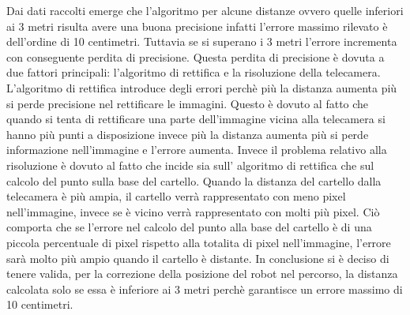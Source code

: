 	Dai dati raccolti emerge che l'algoritmo per alcune distanze ovvero quelle inferiori ai 3 metri risulta avere una buona precisione infatti l'errore massimo rilevato è dell'ordine di 10 centimetri. Tuttavia se si superano i 3 metri l'errore incrementa con conseguente perdita di precisione. Questa perdita di precisione è dovuta a due fattori principali: l'algoritmo di rettifica e la risoluzione della telecamera. L'algoritmo di rettifica introduce degli errori perchè più la distanza aumenta più si perde precisione nel rettificare le immagini. Questo è dovuto al fatto che quando si tenta di rettificare una parte dell'immagine vicina alla telecamera si hanno più punti a disposizione invece più la distanza aumenta più si perde informazione nell'immagine e l'errore aumenta. Invece il problema relativo alla risoluzione è dovuto al fatto che incide sia sull' algoritmo di rettifica che sul calcolo del punto sulla base del cartello. Quando la distanza del cartello dalla telecamera è più ampia, il cartello verrà rappresentato con meno pixel nell'immagine, invece se è vicino verrà rappresentato con molti più pixel. Ciò comporta che se l'errore nel calcolo del punto alla base del cartello è di una piccola percentuale di pixel rispetto alla totalita di pixel nell'immagine, l'errore sarà molto più ampio quando il cartello è distante.
	In conclusione si è deciso di tenere valida, per la correzione della posizione del robot nel percorso, la distanza calcolata solo se essa è inferiore ai 3 metri perchè garantisce un errore massimo di 10 centimetri. 





